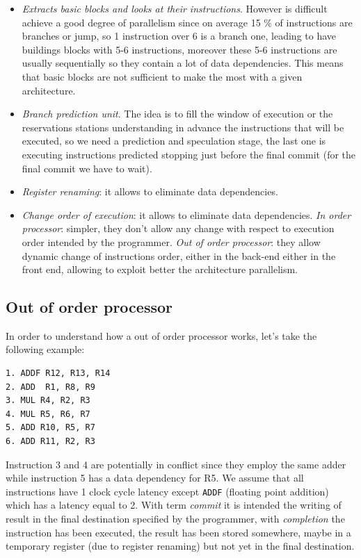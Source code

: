 \begin{itemize}
  \item \textit{Extracts basic blocks and looks at their instructions}. However is difficult achieve a good degree of parallelism since on average 15 \% of instructions are branches or jump, so 1 instruction over 6 is a branch one, leading to have buildings blocks with 5-6 instructions, moreover these 5-6 instructions are usually sequentially so they contain a lot of data dependencies. This means that basic blocks are not sufficient to make the most with a given architecture.

  \item \textit{Branch prediction unit}. The idea is to fill the window of execution or the reservations stations understanding in advance the instructions that will be executed, so we need a prediction and speculation stage, the last one is executing instructions predicted stopping just before the final commit (for the final commit we have to wait).

  \item \textit{Register renaming}: it allows to eliminate data dependencies.

  \item \textit{Change order of execution}: it allows to eliminate data dependencies.
    \subitem \textit{In order processor}: simpler, they don't allow any change with respect to execution order intended by the programmer.
    \subitem \textit{Out of order processor}: they allow dynamic change of instructions order, either in the back-end either in the front end, allowing to exploit better the architecture parallelism.
\end{itemize}

\subsection{Out of order processor}
In order to understand how a out of order processor works, let's take the following example:

\begin{verbatim}
1. ADDF R12, R13, R14
2. ADD  R1, R8, R9
3. MUL R4, R2, R3
4. MUL R5, R6, R7
5. ADD R10, R5, R7
6. ADD R11, R2, R3
\end{verbatim}


Instruction 3 and 4 are potentially in conflict since they employ the same adder while instruction 5 has a data dependency for R5. We assume that all instructions have 1 clock cycle latency except \verb|ADDF| (floating point addition) which has a latency equal to 2.
With term \textit{commit} it is intended the writing of result in the final destination specified by the programmer, with \textit{completion} the instruction has been executed, the result has been stored somewhere, maybe in a temporary register (due to register renaming) but not yet in the final destination.

